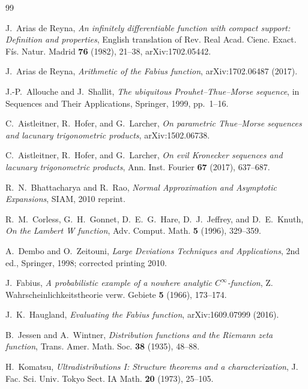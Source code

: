\documentclass[11pt]{article}
\numberwithin{equation}{section}
\theoremstyle{definition}
\begin{document}
\begin{thebibliography}{99}

J.~Arias de Reyna,
\newblock \emph{An infinitely differentiable function with compact support: Definition and properties},
\newblock English translation of Rev. Real Acad. Cienc. Exact. F\'is. Natur. Madrid \textbf{76} (1982), 21--38,
\newblock arXiv:1702.05442.

J.~Arias de Reyna,
\newblock \emph{Arithmetic of the Fabius function},
\newblock arXiv:1702.06487 (2017).

J.-P.~Allouche and J.~Shallit,
\newblock \emph{The ubiquitous Prouhet--Thue--Morse sequence},
\newblock in Sequences and Their Applications, Springer, 1999, pp.~1--16.

C.~Aistleitner, R.~Hofer, and G.~Larcher,
\newblock \emph{On parametric Thue--Morse sequences and lacunary trigonometric products},
\newblock arXiv:1502.06738.

C.~Aistleitner, R.~Hofer, and G.~Larcher,
\newblock \emph{On evil Kronecker sequences and lacunary trigonometric products},
\newblock Ann. Inst. Fourier \textbf{67} (2017), 637--687.

R.~N.~Bhattacharya and R.~Rao,
\newblock \emph{Normal Approximation and Asymptotic Expansions},
\newblock SIAM, 2010 reprint.

R.~M.~Corless, G.~H.~Gonnet, D.~E.~G.~Hare, D.~J.~Jeffrey, and D.~E.~Knuth,
\newblock \emph{On the Lambert W function},
\newblock Adv. Comput. Math. \textbf{5} (1996), 329--359.

A.~Dembo and O.~Zeitouni,
\newblock \emph{Large Deviations Techniques and Applications},
\newblock 2nd ed., Springer, 1998; corrected printing 2010.

J.~Fabius,
\newblock \emph{A probabilistic example of a nowhere analytic \(C^\infty\)-function},
\newblock Z. Wahrscheinlichkeitstheorie verw. Gebiete \textbf{5} (1966), 173--174.

J.~K.~Haugland,
\newblock \emph{Evaluating the Fabius function},
\newblock arXiv:1609.07999 (2016).

B.~Jessen and A.~Wintner,
\newblock \emph{Distribution functions and the Riemann zeta function},
\newblock Trans. Amer. Math. Soc. \textbf{38} (1935), 48--88.

H.~Komatsu,
\newblock \emph{Ultradistributions I: Structure theorems and a characterization},
\newblock J. Fac. Sci. Univ. Tokyo Sect. IA Math. \textbf{20} (1973), 25--105.


\end{thebibliography}
\end{document}
